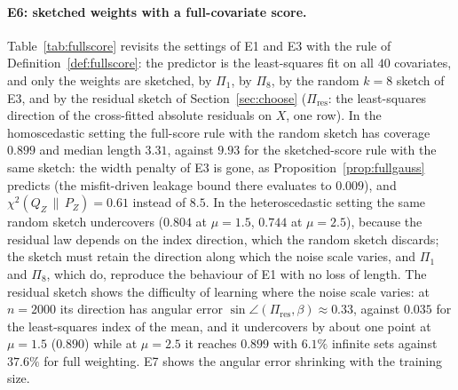 \documentclass[11pt,a4paper]{article}
\newcommand{\chisqZ}{\chi^2(Q_Z\,\|\,P_Z)}
\theoremstyle{plain}
\theoremstyle{definition}
\theoremstyle{remark}
\begin{document}
\FloatBarrier

\paragraph{E6: sketched weights with a full-covariate score.}
Table~\ref{tab:fullscore} revisits the settings of E1 and E3 with the rule of Definition~\ref{def:fullscore}: the predictor is the least-squares fit on all $40$ covariates, and only the weights are sketched, by $\Pi_1$, by $\Pi_8$, by the random $k=8$ sketch of E3, and by the residual sketch of Section~\ref{sec:choose} ($\Pi_{\mathrm{res}}$: the least-squares direction of the cross-fitted absolute residuals on $X$, one row). In the homoscedastic setting the full-score rule with the random sketch has coverage $0.899$ and median length $3.31$, against $9.93$ for the sketched-score rule with the same sketch: the width penalty of E3 is gone, as Proposition~\ref{prop:fullgauss} predicts (the misfit-driven leakage bound there evaluates to $0.009$), and $\chisqZ=0.61$ instead of $8.5$. In the heteroscedastic setting the same random sketch undercovers ($0.804$ at $\mu=1.5$, $0.744$ at $\mu=2.5$), because the residual law depends on the index direction, which the random sketch discards; the sketch must retain the direction along which the noise scale varies, and $\Pi_1$ and $\Pi_8$, which do, reproduce the behaviour of E1 with no loss of length. The residual sketch shows the difficulty of learning where the noise scale varies: at $n=2000$ its direction has angular error $\sin\angle(\Pi_{\mathrm{res}},\beta)\approx0.33$, against $0.035$ for the least-squares index of the mean, and it undercovers by about one point at $\mu=1.5$ ($0.890$) while at $\mu=2.5$ it reaches $0.899$ with $6.1\%$ infinite sets against $37.6\%$ for full weighting. E7 shows the angular error shrinking with the training size.
\end{document}
